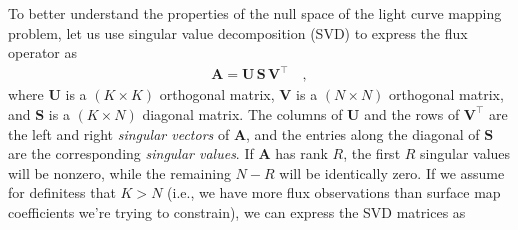\documentclass[modern]{aastex62}
\begin{document}
To better understand the properties of the null space of the light curve
mapping problem, let
%
us use singular value decomposition (SVD) to express
the flux operator as
%
\begin{align}
    \mathbf{A} = \mathbf{U} \, \mathbf{S} \, \mathbf{V}^\top
    \quad,
\end{align}
%
where $\mathbf{U}$ is a $(K \times K)$ orthogonal matrix,
$\mathbf{V}$ is a $(N \times N)$ orthogonal matrix,
and $\mathbf{S}$ is a $(K \times N)$ diagonal matrix.
%
The columns of $\mathbf{U}$ and the rows of $\mathbf{V}^\top$ are the left and right
\emph{singular vectors} of $\mathbf{A}$, and the entries along the
diagonal of $\mathbf{S}$ are the corresponding \emph{singular values}. If $\mathbf{A}$
has rank $R$, the first $R$ singular values will be nonzero, while the
remaining $N - R$ will be identically zero.
If we assume for definitess that $K > N$ (i.e., we have more flux observations
than surface map coefficients we're trying to constrain), we can express the
SVD matrices as
%
\end{document}
